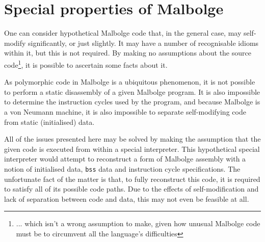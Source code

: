 \section{Special properties of Malbolge}

\par One can consider hypothetical Malbolge code that, in the general case, may self-modify significantly, or just slightly. It may have a number of recognisable idioms within it, but this is not required. By making no assumptions about the source code\footnote{... which isn't a wrong assumption to make, given how unusual Malbolge code must be to circumvent all the language's difficulties}, it is possible to ascertain some facts about it.

\par As polymorphic code in Malbolge is a ubiquitous phenomenon, it is not possible to perform a static disassembly of a given Malbolge program. It is also impossible to determine the instruction cycles used by the program, and because Malbolge is a von Neumann machine, it is also impossible to separate self-modifying code from static (initialised) data.

\par All of the issues presented here may be solved by making the assumption that the given code is executed from within a special interpreter. This hypothetical special interpreter would attempt to reconstruct a form of Malbolge assembly with a notion of initialised data, \verb|bss| data and instruction cycle specifications. The unfortunate fact of the matter is that, to fully reconstruct this code, it is required to satisfy all of its possible code paths. Due to the effects of self-modification and lack of separation between code and data, this may not even be feasible at all.

